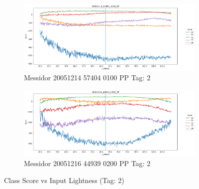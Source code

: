 \begin{figure}[ht!]
	\begin{subfigure}[b]{ 0.85\textwidth}
		\centering
		\includegraphics[width=\textwidth]{Figures/chapter_stability/20051214_57404_0100_PP/l/scores.png}
		\caption{Messidor 20051214 57404 0100 PP Tag: 2}		
	\end{subfigure}	
	\begin{subfigure}[b]{ 0.85\textwidth}
		\centering
		\includegraphics[width=\textwidth]{Figures/chapter_stability/20051216_44939_0200_PP/l/scores.png}
		\caption{Messidor 20051216 44939 0200 PP Tag: 2}		
	\end{subfigure}
	\hfill 
	\caption[Score vs Lightness (Tag: 2)]{Class Score vs Input Lightness (Tag: 2)}  
	\label{sta:fig:lig2} 
\end{figure}

